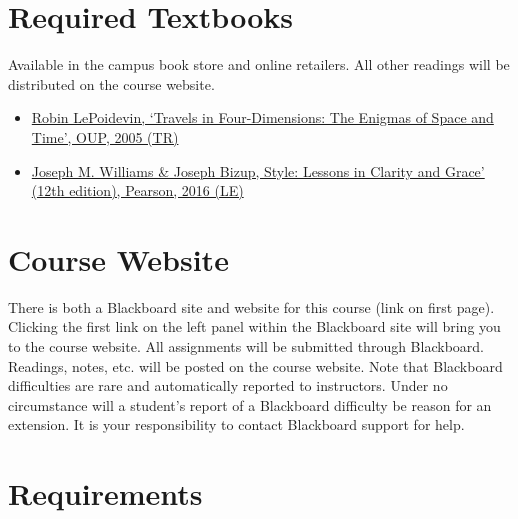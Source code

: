\documentclass[article,oneside]{memoir}
\begin{document}
\section{Required Textbooks}
Available in the campus book store and online retailers. All other readings will be distributed on the course website. 
\begin{itemize}
\item \href{http://www.amazon.com/Travels-Four-Dimensions-Enigmas-Space/dp/0198752555/ref=sr_1_1?ie=UTF8&qid=1452098846&sr=8-1&keywords=robin+le+poidevin+enigmas}{Robin LePoidevin, `Travels in Four-Dimensions: The Enigmas of Space and Time', OUP, 2005 (TR)}
\item \href{https://www.amazon.com/dp/0134080416/ref=cm_sw_em_r_mt_dp_U_rWzyDbM9N4ZWN}{Joseph M. Williams \& Joseph Bizup, Style: Lessons in Clarity and Grace' (12th edition), Pearson, 2016 (LE)}
\end{itemize}


\section{Course Website}
There is both a Blackboard site and website for this course (link on first page). Clicking the first link on the left panel within the Blackboard site will bring you to the course website. All assignments will be submitted through Blackboard. Readings, notes, etc. will be posted on the course website. Note that Blackboard difficulties are rare and automatically reported to instructors. Under no circumstance will a student's report of a Blackboard difficulty be reason for an extension. It is your responsibility to contact Blackboard support for help.



\section{Requirements}
\end{document}
